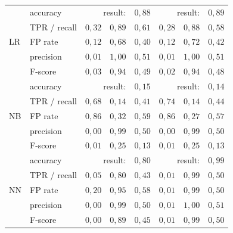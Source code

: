 \begin{table}[t]
{\begin{tabular}{llrrrrrr}
\midrule
\multirow{5}{*}{LR}  & accuracy     & \multicolumn{2}{r}{result:} & $0,88$            & \multicolumn{2}{r}{result:} & $0,89$              \\
                     & TPR / recall & $0,32$    & $0,89$          & $0,61$            & $0,28$    & $0,88$          & $0,58$              \\
                     & FP rate      & $0,12$    & $0,68$          & $0,40$            & $0,12$    & $0,72$          & $0,42$              \\
                     & precision    & $0,01$    & $1,00$          & $0,51$            & $0,01$    & $1,00$          & $0,51$              \\
                     & F-score      & $0,03$    & $0,94$          & $0,49$            & $0,02$    & $0,94$          & $0,48$              \\ 
\midrule
\multirow{5}{*}{NB}  & accuracy     & \multicolumn{2}{r}{result:} & $0,15$            & \multicolumn{2}{r}{result:} & $0,14$              \\
                     & TPR / recall & $0,68$    & $0,14$          & $0,41$            & $0,74$    & $0,14$          & $0,44$              \\
                     & FP rate      & $0,86$    & $0,32$          & $0,59$            & $0,86$    & $0,27$          & $0,57$              \\
                     & precision    & $0,00$    & $0,99$          & $0,50$            & $0,00$    & $0,99$          & $0,50$              \\
                     & F-score      & $0,01$    & $0,25$          & $0,13$            & $0,01$    & $0,25$          & $0,13$              \\ 
\midrule
\multirow{5}{*}{NN}  & accuracy     & \multicolumn{2}{r}{result:} & $0,80$            & \multicolumn{2}{r}{result:} & $0,99$              \\
                     & TPR / recall & $0,05$    & $0,80$          & $0,43$            & $0,01$    & $0,99$          & $0,50$              \\
                     & FP rate      & $0,20$    & $0,95$          & $0,58$            & $0,01$    & $0,99$          & $0,50$              \\
                     & precision    & $0,00$    & $0,99$          & $0,50$            & $0,01$    & $1,00$          & $0,51$              \\
                     & F-score      & $0,00$    & $0,89$          & $0,45$            & $0,01$    & $0,99$          & $0,50$              \\ 

\end{tabular}}
\end{table}
